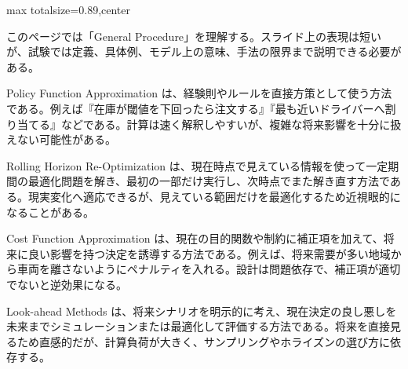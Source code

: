 \begin{minipage}[t]{0.58\textwidth}
\begin{adjustbox}{max totalsize={\textwidth}{0.89\textheight},center}
\begin{minipage}{\textwidth}\scriptsize
{}このページでは「General Procedure」を理解する。スライド上の表現は短いが、試験では定義、具体例、モデル上の意味、手法の限界まで説明できる必要がある。\par
Policy Function Approximation は、経験則やルールを直接方策として使う方法である。例えば『在庫が閾値を下回ったら注文する』『最も近いドライバーへ割り当てる』などである。計算は速く解釈しやすいが、複雑な将来影響を十分に扱えない可能性がある。\par
Rolling Horizon Re-Optimization は、現在時点で見えている情報を使って一定期間の最適化問題を解き、最初の一部だけ実行し、次時点でまた解き直す方法である。現実変化へ適応できるが、見えている範囲だけを最適化するため近視眼的になることがある。\par
Cost Function Approximation は、現在の目的関数や制約に補正項を加えて、将来に良い影響を持つ決定を誘導する方法である。例えば、将来需要が多い地域から車両を離さないようにペナルティを入れる。設計は問題依存で、補正項が適切でないと逆効果になる。\par
Look-ahead Methods は、将来シナリオを明示的に考え、現在決定の良し悪しを未来までシミュレーションまたは最適化して評価する方法である。将来を直接見るため直感的だが、計算負荷が大きく、サンプリングやホライズンの選び方に依存する。\par

\end{minipage}
\end{adjustbox}
\end{minipage}
